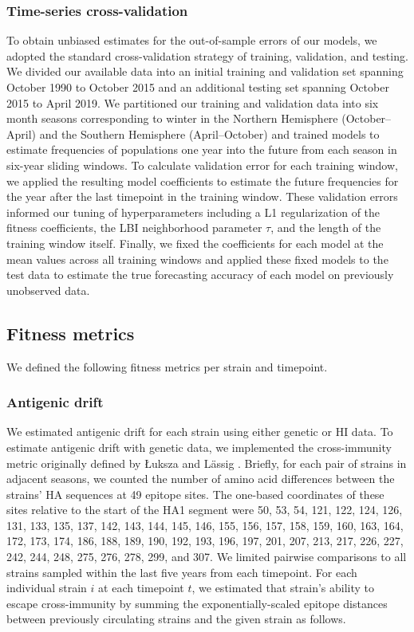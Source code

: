 \subsubsection*{Time-series cross-validation}

To obtain unbiased estimates for the out-of-sample errors of our models, we adopted the standard cross-validation strategy of training, validation, and testing.
We divided our available data into an initial training and validation set spanning October 1990 to October 2015 and an additional testing set spanning October 2015 to April 2019.
We partitioned our training and validation data into six month seasons corresponding to winter in the Northern Hemisphere (October--April) and the Southern Hemisphere (April--October) and trained models to estimate frequencies of populations one year into the future from each season in six-year sliding windows.
To calculate validation error for each training window, we applied the resulting model coefficients to estimate the future frequencies for the year after the last timepoint in the training window.
These validation errors informed our tuning of hyperparameters including a L1 regularization of the fitness coefficients, the LBI neighborhood parameter $\tau$, and the length of the training window itself.
Finally, we fixed the coefficients for each model at the mean values across all training windows and applied these fixed models to the test data to estimate the true forecasting accuracy of each model on previously unobserved data.

\subsection*{Fitness metrics}

We defined the following fitness metrics per strain and timepoint.

\subsubsection*{Antigenic drift}

We estimated antigenic drift for each strain using either genetic or HI data.
To estimate antigenic drift with genetic data, we implemented the cross-immunity metric originally defined by {\L}uksza and L\"assig \cite{Luksza:2014hj}.
Briefly, for each pair of strains in adjacent seasons, we counted the number of amino acid differences between the strains' HA sequences at 49 epitope sites.
The one-based coordinates of these sites relative to the start of the HA1 segment were 50, 53, 54, 121, 122, 124, 126, 131, 133, 135, 137, 142, 143, 144, 145, 146, 155, 156, 157, 158, 159, 160, 163, 164, 172, 173, 174, 186, 188, 189, 190, 192, 193, 196, 197, 201, 207, 213, 217, 226, 227, 242, 244, 248, 275, 276, 278, 299, and 307.
We limited pairwise comparisons to all strains sampled within the last five years from each timepoint.
For each individual strain $i$ at each timepoint $t$, we estimated that strain's ability to escape cross-immunity by summing the exponentially-scaled epitope distances between previously circulating strains and the given strain as follows.

